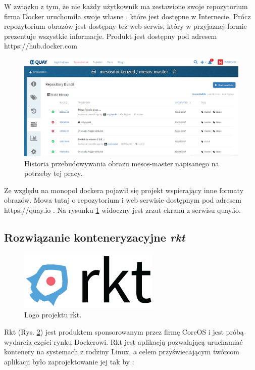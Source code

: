 \documentclass[10pt,a4paper,titlepage,twoside]{report}
\begin{document}
W związku z tym, że nie każdy użytkownik ma zestawione swoje repozytorium firma Docker uruchomiła swoje własne \cite{ad28}, które jest dostępne w Internecie. Prócz repozytorium obrazów jest dostępny też web serwis, który w przyjaznej formie prezentuje wszystkie informacje. Produkt jest dostępny pod adresem https://hub.docker.com

\begin{figure}[!h]
	\centering
	\includegraphics[scale=1]{pics/quay.png}
	\caption{Historia przebudowywania obrazu mesos-master napisanego na potrzeby tej pracy.}
	\label{quay_io}
\end{figure}

Ze względu na monopol dockera pojawił się projekt wspierający inne formaty obrazów. Mowa tutaj o repozytorium i web serwisie dostępnym pod adresem https://quay.io \cite{ad28}. Na rysunku \ref{quay_io} widoczny jest zrzut ekranu z serwisu quay.io.

\subsection{Rozwiązanie konteneryzacyjne \textit{rkt}}

\begin{figure}[!h]
	\centering
	\includegraphics[scale=1]{pics/rkt-horizontal-color.png}
	\caption{Logo projektu rkt.}
	\label{rkt_logo}
\end{figure}

Rkt \cite{ad29}(Rys. \ref{rkt_logo}) jest produktem sponsorowanym przez firmę CoreOS i jest próbą wydarcia części rynku Dockerowi. Rkt jest aplikacją pozwalającą uruchamiać kontenery na systemach z rodziny Linux, a celem przyświecającym twórcom aplikacji było zaprojektowanie jej tak by \cite{ad29}:
\end{document}
